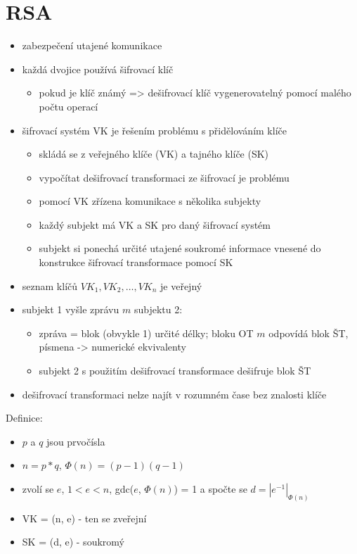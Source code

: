 \documentclass{szzclass}
\begin{document}
\section{RSA}
\begin{itemize}
    \item zabezpečení utajené komunikace
    \item každá dvojice používá šifrovací klíč
    \begin{itemize}
        \item pokud je klíč známý => dešifrovací klíč vygenerovatelný pomocí malého počtu operací
    \end{itemize}
    \item šifrovací systém VK je řešením problému s přidělováním klíče
    \begin{itemize}
        \item skládá se z veřejného klíče (VK) a tajného klíče (SK)
        \item vypočítat dešifrovací transformaci ze šifrovací je problému
        \item pomocí VK zřízena komunikace s několika subjekty
        \item každý subjekt má VK a SK pro daný šifrovací systém
        \item subjekt si ponechá určité utajené soukromé informace vnesené do konstrukce šifrovací transformace pomocí SK
    \end{itemize}
    \item seznam klíčů $VK_1, VK_2,\dots,VK_n$ je veřejný
    \item subjekt 1 vyšle zprávu $m$ subjektu 2:
    \begin{itemize}
        \item zpráva = blok (obvykle 1) určité délky; bloku OT $m$ odpovídá blok ŠT, písmena -> numerické ekvivalenty
        \item subjekt 2 s použitím dešifrovací transformace dešifruje blok ŠT
    \end{itemize}
    \item dešifrovací transformaci nelze najít v rozumném čase bez znalosti klíče
\end{itemize}
Definice:
\begin{itemize}
    \item $p$ a $q$ jsou prvočísla
    \item $n = p*q$, $\Phi(n) = (p - 1)(q - 1)$
    \item zvolí se $e$, $1 < e < n$, gdc($e$, $\Phi(n)$) = 1 a spočte se $d = |e^{-1}|_{\Phi(n)}$
    \item VK = (n, e) - ten se zveřejní
    \item SK = (d, e) - soukromý
\end{itemize}
\end{document}
